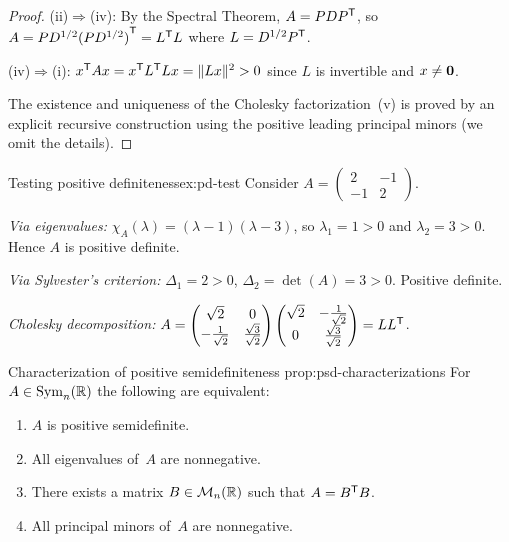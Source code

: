 \begin{proof}
(ii)$\Rightarrow$(iv): By the Spectral Theorem, $A = PD{P}^{\mathsf{T}}$,
so $A = PD^{1/2}{(PD^{1/2})}^{\mathsf{T}} = {L}^{\mathsf{T}}L$ where
$L = D^{1/2}{P}^{\mathsf{T}}$.

(iv)$\Rightarrow$(i): ${x}^{\mathsf{T}}Ax = {x}^{\mathsf{T}}{L}^{\mathsf{T}}Lx
= \lVert Lx\rVert^2 > 0$ since $L$ is invertible and $x\neq\mathbf{0}$.

The existence and uniqueness of the Cholesky factorization~(v) is proved
by an explicit recursive construction using the positive leading
principal minors (we omit the details).
\end{proof}

\begin{example}{Testing positive definiteness}{ex:pd-test}
Consider $A = \begin{pmatrix}2 & -1 \\ -1 & 2\end{pmatrix}$.

\emph{Via eigenvalues:} $\chi_A(\lambda)=(\lambda-1)(\lambda-3)$, so
$\lambda_1=1>0$ and $\lambda_2=3>0$.  Hence $A$ is positive definite.

\emph{Via Sylvester's criterion:} $\Delta_1=2>0$, $\Delta_2=\det(A)=3>0$.
Positive definite.

\emph{Cholesky decomposition:}
$A = \begin{pmatrix}\sqrt{2}&0\\-\frac{1}{\sqrt{2}}&\frac{\sqrt{3}}{\sqrt{2}}\end{pmatrix}
\begin{pmatrix}\sqrt{2}&-\frac{1}{\sqrt{2}}\\0&\frac{\sqrt{3}}{\sqrt{2}}\end{pmatrix}
= L{L}^{\mathsf{T}}$.
\end{example}

\begin{proposition}{Characterization of positive semidefiniteness}%
{prop:psd-characterizations}
For $A\in\operatorname{Sym}_n({\mathbb{R}})$ the following are equivalent:
\begin{enumerate}[label=\textup{(\roman*)}]
  \item $A$ is positive semidefinite.
  \item All eigenvalues of~$A$ are nonnegative.
  \item There exists a matrix $B\in\mathcal{M}_n({\mathbb{R}})$ such that $A={B}^{\mathsf{T}}B$.
  \item All principal minors of~$A$ are nonnegative.
\end{enumerate}
\end{proposition}

